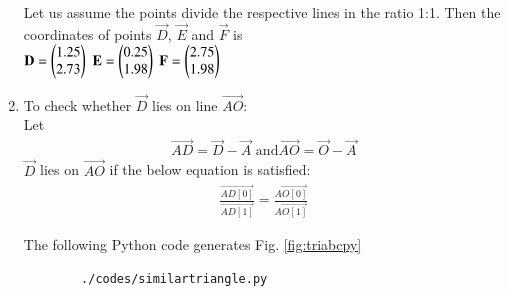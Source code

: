 \begin{enumerate}[label=\thesection.\arabic*.,ref=\thesection.\theenumi]
Let us assume the points divide the respective lines in the ratio 1:1. Then the coordinates of points $\vec{D}$, $\vec{E}$ and $\vec{F}$ is \\
 \quad $ \mathbf{D}= \begin{pmatrix}1.25\\2.73\end{pmatrix}$
    \quad $\mathbf{E}=\begin{pmatrix}0.25\\1.98\end{pmatrix}$
    \quad $\mathbf{F}=\begin{pmatrix}2.75\\1.98\end{pmatrix}$\\
    
    
\item To check whether $\vec{D}$ lies on line $\vec{AO}$:\\
Let
\begin{multline}
 \vec{AD} = \vec{D} - \vec{A}\text{	and}
\vec{AO} = \vec{O} - \vec{A}
\end{multline}
$\vec{D}$ lies on $\vec{AO}$ if the below equation is satisfied:
\begin{align}
\frac{\vec{AD[0]}}{\vec{AD[1]}} = \frac{\vec{AO[0]}}{\vec{AO[1]}}
\end{align}

%  
  

    The  following Python code generates Fig. \ref{fig:triabcpy}\\
    \begin{lstlisting}
        ./codes/similartriangle.py
    \end{lstlisting}


\end{enumerate}
